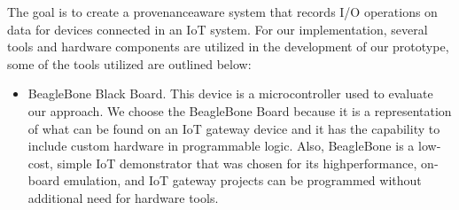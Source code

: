 The goal is to create a provenance\-aware system that records I/O operations on data for devices connected in an IoT system. For our implementation, several tools and hardware components are utilized in the development of our prototype, some of the tools utilized are outlined below:

\begin{itemize}
\item BeagleBone Black Board. This device is a microcontroller used to evaluate our approach. We choose the BeagleBone Board because it is a representation of what can be found on an IoT gateway device and it has the capability to include custom hardware in programmable logic. Also, BeagleBone is a low­cost, simple IoT demonstrator that was chosen for its high­performance, on­board emulation, and IoT gateway projects can be programmed without additional need for hardware tools.


\end{itemize}


%

